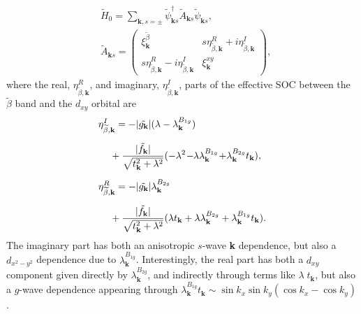 \documentclass[%
reprint,
superscriptaddress,
 amsmath,amssymb,
 aps,
prb,
nobalancelastpage,
]{revtex4-2}
\begin{document}
\begin{equation}
\begin{aligned}
&\widetilde{H}_{0}=\sum_{\textbf{k},s=\pm}\widetilde{\psi}_{\textbf{k}s}^{\dagger}\widetilde{A}_{\textbf{k}s}\widetilde{\psi}_{\textbf{k}s},\\[6pt]
&\widetilde{A}_{\textbf{k}s} = 
 \begin{pmatrix} 
    \xi_{\textbf{k}}^{\widetilde{\beta}} & s\eta_{\widetilde{\beta},\textbf{k}}^{R}+i\eta_{\widetilde{\beta},\textbf{k}}^{I}  \\[7pt]
     s\eta_{\widetilde{\beta},\textbf{k}}^{R}-i\eta_{\widetilde{\beta},\textbf{k}}^{I} & \xi_{\textbf{k}}^{xy}
\end{pmatrix},
\end{aligned}
\end{equation}
where the real, $\eta_{\widetilde{\beta},\textbf{k}}^{R}$, and imaginary, $\eta_{\widetilde{\beta},\textbf{k}}^{I}$, parts of the effective SOC between the $\widetilde{\beta}$ band and the $d_{xy}$ orbital are
\begin{equation}
\label{effectiveSOC}
\begin{aligned}
\eta_{\widetilde{\beta},\textbf{k}}^{I} &= -|\tilde{g_{\textbf{k}}}|(\lambda - \lambda^{B_{1g}}_{\textbf{k}}) \hspace{-0.3mm}  \\[6pt]&\hspace{-2mm}+ \frac{|\tilde{f_{\textbf{k}}}|}{\sqrt{t_{\textbf{k}}^{2}+\lambda^2}}(-\lambda^2 \hspace{-0.6mm} - \hspace{-1.0mm}\lambda \lambda^{B_{1g}}_{\textbf{k}}\hspace{-0.6mm} +\hspace{-0.8mm} \lambda^{B_{2g}}_{\textbf{k}}t_{\textbf{k}}), \\[6pt]
\eta_{\widetilde{\beta},\textbf{k}}^{R} &= -|\tilde{g_{\textbf{k}}}|\lambda^{B_{2g}}_{\textbf{k}} \\[6pt]&\hspace{-2mm}+ \frac{|\tilde{f_{\textbf{k}}}|}{\sqrt{t_{\textbf{k}}^2+\lambda^2}}(\lambda t_{\textbf{k}} + \lambda \lambda^{B_{2g}}_{\textbf{k}} + \lambda^{B_{1g}}_{\textbf{k}}t_{\textbf{k}} ).
\end{aligned}
\end{equation}
The imaginary part has both an anisotropic $s$-wave \textbf{k} dependence, but also a $d_{x^2-y^2}$ dependence due to $\lambda_{\textbf{k}}^{B_{1g}}$. Interestingly, the real part has both a $d_{xy}$ component given directly by $\lambda_{\textbf{k}}^{B_{2g}}$, and indirectly through terms like $\lambda\;t_{\textbf{k}}$, but also a $g$-wave dependence appearing through $\lambda_{\textbf{k}}^{B_{1g}}t_{\textbf{k}}\sim \sin{k_x}\sin{k_y}(\cos{k_x}-\cos{k_y})$. 
\end{document}
